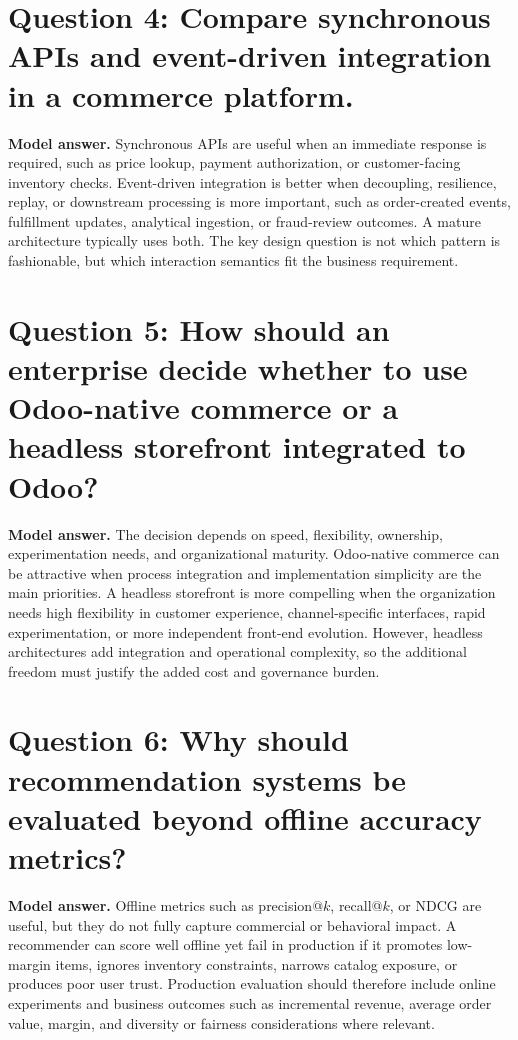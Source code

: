 \section*{Question 4: Compare synchronous APIs and event-driven integration in a commerce platform.}
\textbf{Model answer.}
Synchronous APIs are useful when an immediate response is required, such as price lookup, payment authorization, or customer-facing inventory checks.
Event-driven integration is better when decoupling, resilience, replay, or downstream processing is more important, such as order-created events, fulfillment updates, analytical ingestion, or fraud-review outcomes.
A mature architecture typically uses both.
The key design question is not which pattern is fashionable, but which interaction semantics fit the business requirement.

\section*{Question 5: How should an enterprise decide whether to use Odoo-native commerce or a headless storefront integrated to Odoo?}
\textbf{Model answer.}
The decision depends on speed, flexibility, ownership, experimentation needs, and organizational maturity.
Odoo-native commerce can be attractive when process integration and implementation simplicity are the main priorities.
A headless storefront is more compelling when the organization needs high flexibility in customer experience, channel-specific interfaces, rapid experimentation, or more independent front-end evolution.
However, headless architectures add integration and operational complexity, so the additional freedom must justify the added cost and governance burden.

\section*{Question 6: Why should recommendation systems be evaluated beyond offline accuracy metrics?}
\textbf{Model answer.}
Offline metrics such as precision@$k$, recall@$k$, or NDCG are useful, but they do not fully capture commercial or behavioral impact.
A recommender can score well offline yet fail in production if it promotes low-margin items, ignores inventory constraints, narrows catalog exposure, or produces poor user trust.
Production evaluation should therefore include online experiments and business outcomes such as incremental revenue, average order value, margin, and diversity or fairness considerations where relevant.

